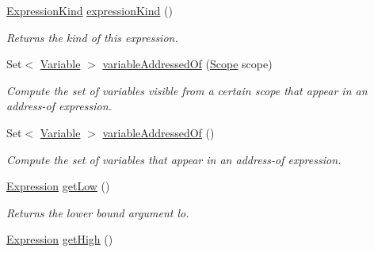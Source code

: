 \begin{DoxyCompactItemize}
\item 
\hyperlink{enumedu_1_1udel_1_1cis_1_1vsl_1_1civl_1_1model_1_1IF_1_1expression_1_1Expression_1_1ExpressionKind}{Expression\+Kind} \hyperlink{classedu_1_1udel_1_1cis_1_1vsl_1_1civl_1_1model_1_1common_1_1expression_1_1CommonRegularRangeExpression_a73c78694fd3241c1780020b602f4f4f6}{expression\+Kind} ()
\begin{DoxyCompactList}\small\item\em Returns the kind of this expression. \end{DoxyCompactList}\item 
Set$<$ \hyperlink{interfaceedu_1_1udel_1_1cis_1_1vsl_1_1civl_1_1model_1_1IF_1_1variable_1_1Variable}{Variable} $>$ \hyperlink{classedu_1_1udel_1_1cis_1_1vsl_1_1civl_1_1model_1_1common_1_1expression_1_1CommonRegularRangeExpression_a7c854be254bc78646825c55eab7f1486}{variable\+Addressed\+Of} (\hyperlink{interfaceedu_1_1udel_1_1cis_1_1vsl_1_1civl_1_1model_1_1IF_1_1Scope}{Scope} scope)
\begin{DoxyCompactList}\small\item\em Compute the set of variables visible from a certain scope that appear in an address-\/of expression. \end{DoxyCompactList}\item 
Set$<$ \hyperlink{interfaceedu_1_1udel_1_1cis_1_1vsl_1_1civl_1_1model_1_1IF_1_1variable_1_1Variable}{Variable} $>$ \hyperlink{classedu_1_1udel_1_1cis_1_1vsl_1_1civl_1_1model_1_1common_1_1expression_1_1CommonRegularRangeExpression_ac517ada213cea3fc03ad0715350c3b59}{variable\+Addressed\+Of} ()
\begin{DoxyCompactList}\small\item\em Compute the set of variables that appear in an address-\/of expression. \end{DoxyCompactList}\item 
\hyperlink{interfaceedu_1_1udel_1_1cis_1_1vsl_1_1civl_1_1model_1_1IF_1_1expression_1_1Expression}{Expression} \hyperlink{classedu_1_1udel_1_1cis_1_1vsl_1_1civl_1_1model_1_1common_1_1expression_1_1CommonRegularRangeExpression_ac63a9369150d44c9a18ee8f739da5957}{get\+Low} ()
\begin{DoxyCompactList}\small\item\em Returns the lower bound argument {\ttfamily lo}. \end{DoxyCompactList}\item 
\hyperlink{interfaceedu_1_1udel_1_1cis_1_1vsl_1_1civl_1_1model_1_1IF_1_1expression_1_1Expression}{Expression} \hyperlink{classedu_1_1udel_1_1cis_1_1vsl_1_1civl_1_1model_1_1common_1_1expression_1_1CommonRegularRangeExpression_a436a78b4783fb5331a7baa097c03db5d}{get\+High} ()

\end{DoxyCompactItemize}
